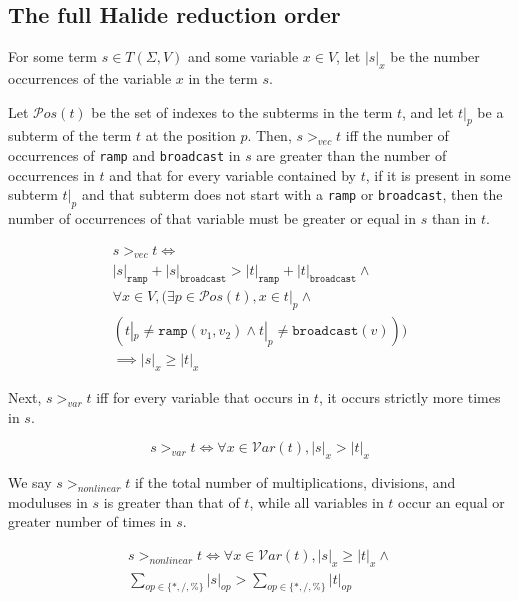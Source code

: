 \documentclass[sigplan,10pt,review,anonymous]{acmart}\settopmatter{printfolios=true,printccs=false,printacmref=false}
\begin{document}
\subsection{The full Halide reduction order}
\label{a:reductionorder}

For some term $s \in T(\Sigma, V)$ and some variable $x \in V$, let $|s|_x$ be the number occurrences of the variable $x$ in the term $s$.

Let $\mathcal{P}os(t)$ be the set of indexes to the subterms in the term $t$, and let $t|_p$ be a subterm of the term $t$ at the position $p$. Then, $s >_{vec} t$ iff the number of occurrences of \texttt{ramp} and \texttt{broadcast} in $s$ are greater than the number of occurrences in $t$ and that for every variable contained by $t$, if it is present in some subterm $t|_p$ and that subterm does not start with a \texttt{ramp} or \texttt{broadcast}, then the number of occurrences of that variable must be greater or equal in $s$ than in $t$.

\begin{gather*}
s >_{vec} t \iff \\
 |s|_{\texttt{ramp}} + |s|_{\texttt{broadcast}} > |t|_{\texttt{ramp}} + |t|_{\texttt{broadcast}} \wedge \\
\forall x \in V, (\exists p \in \mathcal{P}os(t), x \in t|_p \wedge \\
(t|_p \neq \texttt{ramp}(v_1,v_2) \wedge t|_p \neq \texttt{broadcast}(v))) \\
\implies |s|_x \geq |t|_x
\end{gather*}

Next, $s >_{var} t$ iff for every variable that occurs in $t$, it occurs strictly more times in $s$.

\begin{equation*}
s >_{var} t \iff \forall x \in \mathcal{V}ar(t), |s|_x > |t|_x
\end{equation*}

We say $s >_{nonlinear} t$ if the total number of multiplications, divisions, and moduluses in $s$ is greater than that of $t$, while all variables in $t$ occur an equal or greater number of times in $s$.

\begin{equation}
\begin{split}
s >_{nonlinear} t \iff \forall x \in \mathcal{V}ar(t), |s|_x \geq |t|_x \wedge \\
\sum_{op \in \{*,/,\%\}} |s|_{op} > \sum_{op \in \{*,/,\%\}} |t|_{op}
\end{split}
\end{equation}
\end{document}
